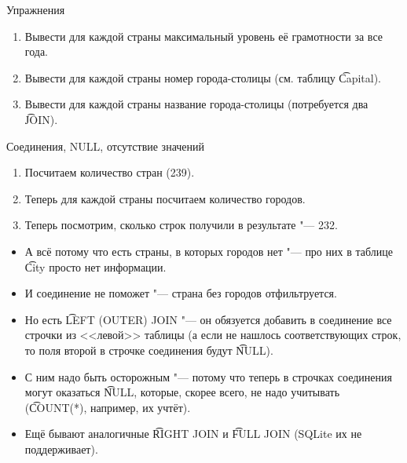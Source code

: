 \begin{frame}{Упражнения}
	\begin{enumerate}
		\item Вывести для каждой страны максимальный уровень её грамотности за все года.
		\item Вывести для каждой страны номер города-столицы (см. таблицу \t{Capital}).
		\item Вывести для каждой страны название города-столицы (потребуется два \t{JOIN}).
	\end{enumerate}
\end{frame}

\begin{frame}{Соединения, NULL, отсутствие значений}
	\begin{enumerate}
		\item Посчитаем количество стран (239).
		\item Теперь для каждой страны посчитаем количество городов.
		\item Теперь посмотрим, сколько строк получили в результате "--- 232.
	\end{enumerate}
	\begin{itemize}
		\item А всё потому что есть страны, в которых городов нет "--- про них в таблице \t{City} просто нет информации.
		\item И соединение не поможет "--- страна без городов отфильтруется.
		\item Но есть \t{LEFT (OUTER) JOIN} "--- он обязуется добавить в соединение все строчки из <<левой>> таблицы
			(а если не нашлось соответствующих строк, то поля второй в строчке соединения будут \t{NULL}).
		\item С ним надо быть осторожным "--- потому что теперь в строчках соединения могут оказаться \t{NULL},
			которые, скорее всего, не надо учитывать (\t{COUNT(*)}, например, их учтёт).
		\item Ещё бывают аналогичные \t{RIGHT JOIN} и \t{FULL JOIN} (SQLite их не поддерживает).
	\end{itemize}
\end{frame}

